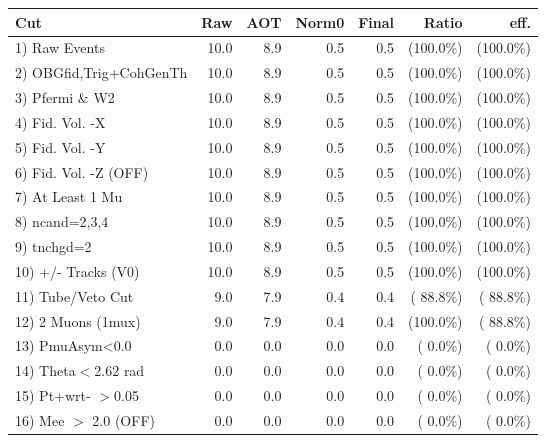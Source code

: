  \begin{table}[h!]\centering
 \begin{tabular}{||l||r|r|r|r|r|r||}
 \hline
 \hline
 Cut & Raw & AOT & Norm0 & Final & Ratio & eff.       \\
 \hline
  1) Raw Events           &         10.0 &          8.9 &          0.5 &          0.5 & (100.0\%) & (100.0\%) \\
  2) OBGfid,Trig+CohGenTh &         10.0 &          8.9 &          0.5 &          0.5 & (100.0\%) & (100.0\%) \\
  3) Pfermi \& W2         &         10.0 &          8.9 &          0.5 &          0.5 & (100.0\%) & (100.0\%) \\
  4) Fid. Vol. -X         &         10.0 &          8.9 &          0.5 &          0.5 & (100.0\%) & (100.0\%) \\
  5) Fid. Vol. -Y         &         10.0 &          8.9 &          0.5 &          0.5 & (100.0\%) & (100.0\%) \\
  6) Fid. Vol. -Z (OFF)   &         10.0 &          8.9 &          0.5 &          0.5 & (100.0\%) & (100.0\%) \\
  7) At Least 1 Mu        &         10.0 &          8.9 &          0.5 &          0.5 & (100.0\%) & (100.0\%) \\
  8) ncand=2,3,4          &         10.0 &          8.9 &          0.5 &          0.5 & (100.0\%) & (100.0\%) \\
  9) tnchgd=2             &         10.0 &          8.9 &          0.5 &          0.5 & (100.0\%) & (100.0\%) \\
 10) +/- Tracks (V0)      &         10.0 &          8.9 &          0.5 &          0.5 & (100.0\%) & (100.0\%) \\
 11) Tube/Veto Cut        &          9.0 &          7.9 &          0.4 &          0.4 & ( 88.8\%) & ( 88.8\%) \\
 12) 2 Muons (1mux)       &          9.0 &          7.9 &          0.4 &          0.4 & (100.0\%) & ( 88.8\%) \\
 13) PmuAsym<0.0          &          0.0 &          0.0 &          0.0 &          0.0 & (  0.0\%) & (  0.0\%) \\
 14) Theta$<$2.62 rad     &          0.0 &          0.0 &          0.0 &          0.0 & (  0.0\%) & (  0.0\%) \\
 15) Pt+wrt- $>$0.05      &          0.0 &          0.0 &          0.0 &          0.0 & (  0.0\%) & (  0.0\%) \\
 16) Mee $>$ 2.0  (OFF)   &          0.0 &          0.0 &          0.0 &          0.0 & (  0.0\%) & (  0.0\%) \\

\end{tabular}
\end{table}
